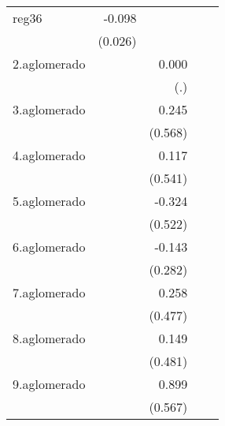 {\begin{longtable}{l*{4}{D{.}{.}{-1}}}
\addlinespace
reg36       &      -0.098\sym{***}&                     &                     &                     \\
            &     (0.026)         &                     &                     &                     \\
\addlinespace
2.aglomerado&                     &       0.000         &                     &                     \\
            &                     &         (.)         &                     &                     \\
\addlinespace
3.aglomerado&                     &       0.245         &                     &                     \\
            &                     &     (0.568)         &                     &                     \\
\addlinespace
4.aglomerado&                     &       0.117         &                     &                     \\
            &                     &     (0.541)         &                     &                     \\
\addlinespace
5.aglomerado&                     &      -0.324         &                     &                     \\
            &                     &     (0.522)         &                     &                     \\
\addlinespace
6.aglomerado&                     &      -0.143         &                     &                     \\
            &                     &     (0.282)         &                     &                     \\
\addlinespace
7.aglomerado&                     &       0.258         &                     &                     \\
            &                     &     (0.477)         &                     &                     \\
\addlinespace
8.aglomerado&                     &       0.149         &                     &                     \\
            &                     &     (0.481)         &                     &                     \\
\addlinespace
9.aglomerado&                     &       0.899         &                     &                     \\
            &                     &     (0.567)         &                     &                     \\

\end{longtable}}
